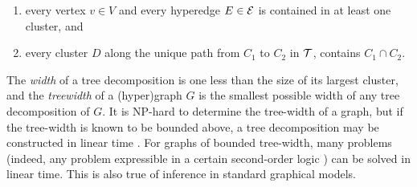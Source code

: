 \begin{enumerate}[nosep]
    \item every vertex $v \in V$ and every hyperedge $E \in \mathcal E$ is contained in at least one cluster, and
        \item every cluster $D$ along the unique path from $C_1$ to $C_2$ in $\cal T$,
         contains $C_1 \cap C_2$.
\end{enumerate}

The \emph{width} of a tree decomposition is one less than the size of its largest cluster,
and the \emph{treewidth} of a (hyper)graph $G$ is the smallest possible width of any tree decomposition of $G$.
It is NP-hard to determine the tree-width of a graph, but
if the tree-width is known to be bounded above, a tree decomposition may be constructed in linear time \parencite{bodlaender1993linear}.
For graphs of bounded tree-width, many problems 
(indeed, any problem expressible in a certain second-order logic \parencite{courcelle1990})
can be solved in
linear time.
This is also true of inference in 
standard graphical models.


